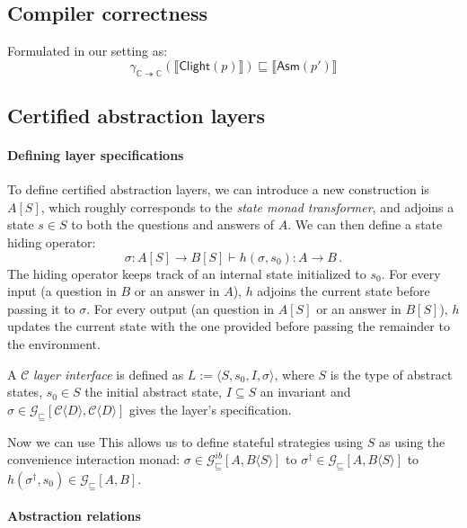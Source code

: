 \documentclass[format=sigplan,authordraft]{acmart}
\newcommand{\gcat}{\mathcal{G}_{\sqsubseteq}}
\newcommand{\kw}[1]{\ensuremath{ \mathsf{#1} }}
\begin{document}

\subsection{Compiler correctness} %

Formulated in our setting as:
\[
    \gamma_{\mathbb{C} \twoheadrightarrow \mathbb{C}}
          (\llbracket \kw{Clight}(p) \rrbracket) \sqsubseteq
    \llbracket \kw{Asm}(p') \rrbracket
\]


\subsection{Certified abstraction layers} %

\paragraph{Defining layer specifications} %

To define certified abstraction layers,
we can introduce a new construction is $A[S]$,
which roughly corresponds to the \emph{state monad transformer},
and adjoins a state $s \in S$ to both the questions and answers of $A$.
We can then define a state hiding operator:
\[
    \sigma : A[S] \rightarrow B[S] \vdash
    h(\sigma, s_0) : A \rightarrow B \,.
\]
The hiding operator keeps track of an internal state
initialized to $s_0$.
For every input (a question in $B$ or an answer in $A$),
$h$ adjoins the current state before passing it to $\sigma$.
For every output (an question in $A[S]$ or an answer in $B[S]$),
$h$ updates the current state with the one provided
before passing the remainder to the environment.

A $\mathcal{C}$ \emph{layer interface} is defined as
$L := \langle S, s_0, I, \sigma \rangle$,
where $S$ is the type of abstract states,
$s_0 \in S$ the initial abstract state,
$I \subseteq S$ an invariant and
$\sigma \in
 \gcat[\mathcal{C}\langle D \rangle, \mathcal{C}\langle D \rangle]$
gives the layer's specification.



Now we can use 
This allows us to define stateful strategies
using $S$ as 
using the convenience interaction monad:
$\sigma \in \gcat^{ib}[A, B \langle S \rangle]$
to $\sigma^\dagger \in \gcat[A, B \langle S \rangle]$
to $h(\sigma^\dagger, s_0) \in \gcat[A, B]$.


\paragraph{Abstraction relations} %
\end{document}
